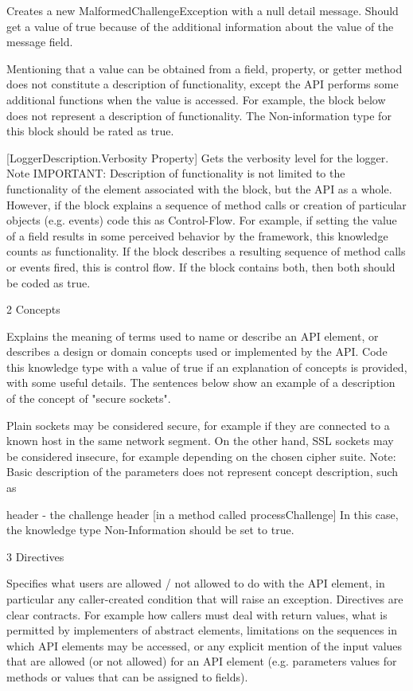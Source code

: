 Creates a new MalformedChallengeException with a null detail message.
Should get a value of true because of the additional information about the value of the message field.

Mentioning that a value can be obtained from a field, property, or getter method does not constitute a description of functionality, except the API performs some additional functions when the value is accessed. For example, the block below does not represent a description of functionality. The Non-information type for this block should be rated as true.

[LoggerDescription.Verbosity Property] Gets the verbosity level for the logger.
Note IMPORTANT: Description of functionality is not limited to the functionality of the element associated with the block, but the API as a whole. However, if the block explains a sequence of method calls or creation of particular objects (e.g. events) code this as Control-Flow. For example, if setting the value of a field results in some perceived behavior by the framework, this knowledge counts as functionality. If the block describes a resulting sequence of method calls or events fired, this is control flow. If the block contains both, then both should be coded as true.

2 Concepts

Explains the meaning of terms used to name or describe an API element, or describes a design or domain concepts used or implemented by the API. Code this knowledge type with a value of true if an explanation of concepts is provided, with some useful details. The sentences below show an example of a description of the concept of "secure sockets".

Plain sockets may be considered secure, for example if they are connected to a known host in the same network segment. On the other hand, SSL sockets may be considered insecure, for example depending on the chosen cipher suite.
Note: Basic description of the parameters does not represent concept description, such as

header - the challenge header [in a method called processChallenge]
In this case, the knowledge type Non-Information should be set to true.

3 Directives

Specifies what users are allowed / not allowed to do with the API element, in particular any caller-created condition that will raise an exception. Directives are clear contracts. For example how callers must deal with return values, what is permitted by implementers of abstract elements, limitations on the sequences in which API elements may be accessed, or any explicit mention of the input values that are allowed (or not allowed) for an API element (e.g. parameters values for methods or values that can be assigned to fields).

